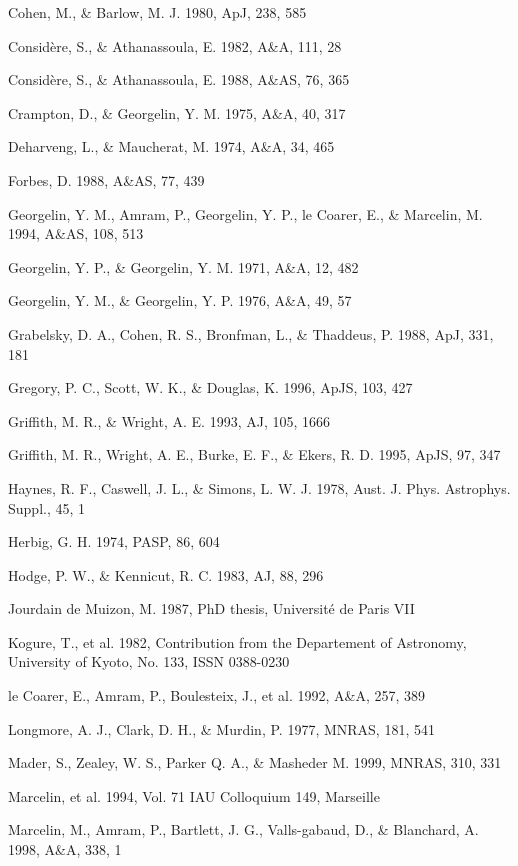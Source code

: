 {{{{{{{{{{{{{ Cohen, M., \& Barlow, M. J. 1980, ApJ, 238, 585

 Consid\`ere, S., \& Athanassoula, E. 1982, A\&A, 111, 28

 Consid\`ere, S., \& Athanassoula, E. 1988, A\&AS, 76, 365

 Crampton, D., \& Georgelin, Y. M. 1975, A\&A, 40, 317

 Deharveng, L., \& Maucherat, M. 1974, A\&A, 34, 465

 Forbes, D. 1988, A\&AS, 77, 439

 Georgelin, Y. M., Amram, P., Georgelin, Y. P., le Coarer, E., \& Marcelin, M. 1994, A\&AS, 108, 513

 Georgelin, Y. P., \& Georgelin, Y. M. 1971, A\&A, 12, 482

 Georgelin, Y. M., \& Georgelin, Y. P. 1976, A\&A, 49, 57

 Grabelsky, D. A., Cohen, R. S., Bronfman, L., \& Thaddeus, P. 1988, ApJ, 331, 181

 Gregory, P. C., Scott, W. K., \& Douglas, K. 1996, ApJS, 103, 427

 Griffith, M. R., \& Wright, A. E. 1993, AJ, 105, 1666

 Griffith, M. R., Wright, A. E., Burke, E. F., \& Ekers, R. D. 1995,
ApJS, 97, 347

 Haynes, R. F., Caswell, J. L., \& Simons, L. W. J. 1978,
Aust. J. Phys. Astrophys. Suppl., 45, 1

 Herbig, G. H. 1974, PASP, 86, 604

 Hodge, P. W., \& Kennicut, R. C. 1983, AJ, 88, 296

 Jourdain de Muizon, M. 1987, PhD thesis, Universit\'e de
Paris VII

 Kogure, T., et al. 1982, Contribution from the Departement of Astronomy, University of Kyoto, No. 133, ISSN 0388-0230

 le Coarer, E., Amram, P., Boulesteix, J., et al. 1992, A\&A, 257, 389

 Longmore, A. J., Clark, D. H., \& Murdin, P. 1977, MNRAS, 181, 541

 Mader, S., Zealey, W. S., Parker Q. A., \& Masheder M. 1999, MNRAS, 310, 331

 Marcelin, et al. 1994, Vol. 71 IAU Colloquium 149, Marseille

 Marcelin, M., Amram, P., Bartlett, J. G., Valls-gabaud, D., \& Blanchard, A. 1998, A\&A, 338, 1

}}}}}}}}}}}}}
